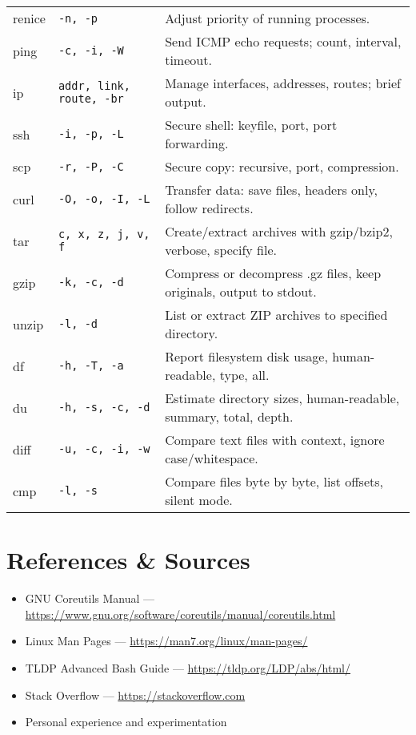 \documentclass[10pt,oneside]{scrbook}
\begin{document}
\begin{longtable}{>{\ttfamily}l l p{4.8cm}}
    renice   & \texttt{-n, -p}     & Adjust priority of running processes. \\
    ping     & \texttt{-c, -i, -W} & Send ICMP echo requests; count, interval, timeout. \\
    ip       & \texttt{addr, link, route, -br} & Manage interfaces, addresses, routes; brief output. \\
    ssh      & \texttt{-i, -p, -L} & Secure shell: keyfile, port, port forwarding. \\
    scp      & \texttt{-r, -P, -C} & Secure copy: recursive, port, compression. \\
    curl     & \texttt{-O, -o, -I, -L} & Transfer data: save files, headers only, follow redirects. \\
    tar      & \texttt{c, x, z, j, v, f} & Create/extract archives with gzip/bzip2, verbose, specify file. \\
    gzip     & \texttt{-k, -c, -d} & Compress or decompress .gz files, keep originals, output to stdout. \\
    unzip    & \texttt{-l, -d}     & List or extract ZIP archives to specified directory. \\
    df       & \texttt{-h, -T, -a} & Report filesystem disk usage, human-readable, type, all. \\
    du       & \texttt{-h, -s, -c, -d} & Estimate directory sizes, human-readable, summary, total, depth. \\
    diff     & \texttt{-u, -c, -i, -w} & Compare text files with context, ignore case/whitespace. \\
    cmp      & \texttt{-l, -s}     & Compare files byte by byte, list offsets, silent mode. \\
  \end{longtable}
\endgroup

\chapter*{References \& Sources}

\begin{itemize}
  \item GNU Coreutils Manual — \url{https://www.gnu.org/software/coreutils/manual/coreutils.html}
  \item Linux Man Pages — \url{https://man7.org/linux/man-pages/}
  \item TLDP Advanced Bash Guide — \url{https://tldp.org/LDP/abs/html/}
  \item Stack Overflow — \url{https://stackoverflow.com}
  \item Personal experience and experimentation
\end{itemize}
\end{document}
